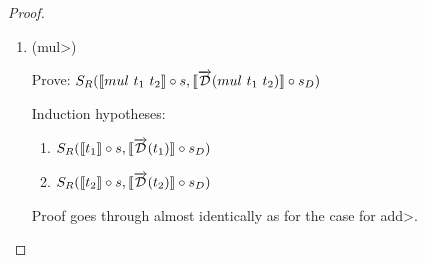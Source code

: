 \documentclass[11pt, final]{article}
\begin{document}
\begin{proof}
\begin{enumerate}
      \item (\<mul>)

      Prove: $S_R(\llbracket mul\ t_1\ t_2 \rrbracket \circ s, \llbracket \overrightarrow{\mathcal{D}}(mul\ t_1\ t_2) \rrbracket \circ s_D)$

      Induction hypotheses:
      \begin{enumerate}
        \item \label{eqn:subst_ih_mul1}$S_R(\llbracket t_1 \rrbracket \circ s, \llbracket \overrightarrow{\mathcal{D}}(t_1) \rrbracket \circ s_D)$
        \item \label{eqn:subst_ih_mul2}$S_R(\llbracket t_2 \rrbracket \circ s, \llbracket \overrightarrow{\mathcal{D}}(t_2) \rrbracket \circ s_D)$
      \end{enumerate}

      Proof goes through almost identically as for the case for \<add>.


\end{enumerate}
\end{proof}
\end{document}
